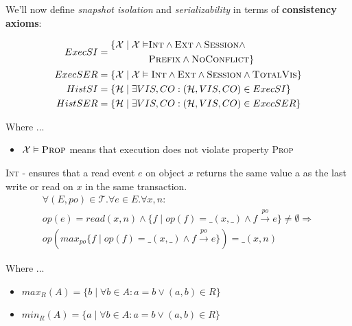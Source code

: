 \documentclass{beamer}
\begin{document}
\begin{frame}
	We'll now define \emph{snapshot isolation} and \emph{serializability} in terms of \textbf{consistency axioms}:
	\begin{definition}
	\begin{equation*}
		\begin{aligned}
			ExecSI = {} &
				\begin{aligned} 
					\{ \mathcal{X} \mid \mathcal{X} \vDash & \textsc{Int} \wedge \textsc{Ext} \wedge \textsc{Session} \wedge \\
														& \textsc{Prefix} \wedge \textsc{NoConflict} \}
				\end{aligned}
				\\
			ExecSER = {} & \{ \mathcal{X} \mid \mathcal{X} \vDash \textsc{Int} \wedge \textsc{Ext} \wedge \textsc{Session} \wedge \textsc{TotalVis} \} \\
			HistSI = {} & \{ \mathcal{H} \mid \exists VIS,CO : (\mathcal{H}, VIS, CO) \in ExecSI \} \\
			HistSER = {} & \{ \mathcal{H} \mid \exists VIS,CO : (\mathcal{H}, VIS, CO) \in ExecSER \} 
		\end{aligned}
	\end{equation*}
	\end{definition}
	Where ...
	\begin{itemize}
		\item $\mathcal{X} \vDash \textsc{Prop}$ means that execution does not violate property \textsc{Prop}
	\end{itemize}
\end{frame}

\begin{frame}
	\begin{definition}
		\textsc{Int} - ensures that a read event $e$ on object $x$ returns the same value a as the last write or read on $x$ in the same transaction.
		\begin{multline*}
			\forall (E,po)\in \mathcal{T} . \forall e \in E . \forall x,n: \\
				op(e) = read(x,n) \wedge \{f\mid op(f) = \_(x,\_)\wedge f \xrightarrow{po} e\} \ne \emptyset \Rightarrow \\
				op\left(max_{po}\{f \mid op\left(f\right) = \_ \left(x, \_\right) \wedge f \xrightarrow{po} e\}\right) = \_(x,n)
		\end{multline*}
	\end{definition}
	Where ...
	\begin{itemize}
		\item $max_R(A) = \{ b \mid \forall b \in A: a = b \vee (a, b) \in R \} $
		\item $min_R(A) = \{ a \mid \forall b \in A: a = b \vee (a, b) \in R \} $
	\end{itemize}
\end{frame}
\end{document}
